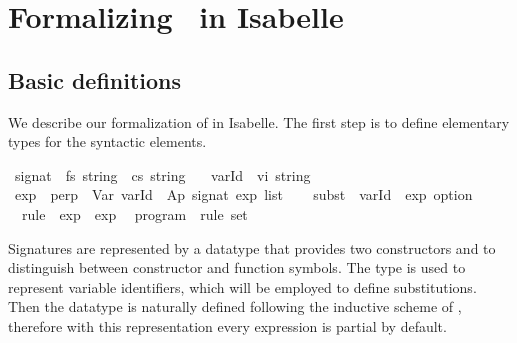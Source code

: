\documentclass{llncs}
\newenvironment{isacode}
{\begin{list}{}{
\setlength{\leftmargin}{4pt}
\setlength{\rightmargin}{0pt}
\setlength{\listparindent}{0pt}\raggedright
\setlength{\itemsep}{0pt}
\setlength{\parsep}{0pt}
\normalfont\ttfamily }\item[]}
{\end{list}}
\begin{document}

\section{Formalizing \crwl\ in Isabelle}\label{formalizing}
\subsection{Basic definitions}
\label{sec:formalizing:basic}












We describe our formalization of \crwl{} in Isabelle. The first step
is to define elementary types for the syntactic elements.


\medskip

\begin{minipage}{\linewidth}
\begin{isacode}
\isamarkupfalse \ signat\ {\isacharequal}\ fs\ string\ {\isacharbar}\ cs\ string\ \ \isanewline
{}\isamarkupfalse \ varId\ {\isacharequal}\ vi\ string\isanewline
{}\isamarkupfalse \ exp\ {\isacharequal}\ perp\ {\isacharbar}\ Var\ varId\ {\isacharbar}\ Ap\ signat\ {\isachardoublequoteopen}exp\ list{\isachardoublequoteclose}\isanewline
{}\isamarkupfalse \ \isanewline
\ \ subst\ {\isacharequal}\ {\isachardoublequoteopen}varId\ {\isasymRightarrow}\ exp\ option{\isachardoublequoteclose}\isanewline
\ \ rule\ {\isacharequal}\ {\isachardoublequoteopen}exp\ {\isacharasterisk}\ exp{\isachardoublequoteclose}\isanewline
\ \ program\ {\isacharequal}\ {\isachardoublequoteopen}rule\ set{\isachardoublequoteclose}\end{isacode}
\end{minipage}


\medskip

\noindent Signatures are represented by a datatype that provides two
constructors  and  to distinguish between
constructor and function symbols.
The type  is used to represent variable identifiers,
which will be employed to define substitutions. Then the datatype
 is naturally defined following the inductive scheme of
, therefore with this representation every expression is
partial by default.
\end{document}
